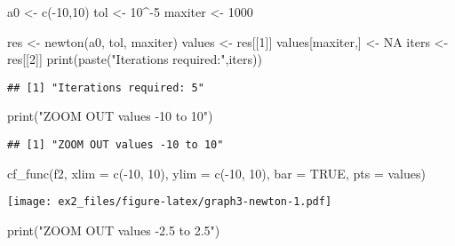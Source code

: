 \documentclass[
]{article}
\newenvironment{Shaded}{\begin{snugshade}}{\end{snugshade}}
\newcommand{\AttributeTok}[1]{\textcolor[rgb]{0.77,0.63,0.00}{#1}}
\newcommand{\ConstantTok}[1]{\textcolor[rgb]{0.00,0.00,0.00}{#1}}
\newcommand{\DecValTok}[1]{\textcolor[rgb]{0.00,0.00,0.81}{#1}}
\newcommand{\FunctionTok}[1]{\textcolor[rgb]{0.00,0.00,0.00}{#1}}
\newcommand{\NormalTok}[1]{#1}
\newcommand{\OtherTok}[1]{\textcolor[rgb]{0.56,0.35,0.01}{#1}}
\newcommand{\SpecialCharTok}[1]{\textcolor[rgb]{0.00,0.00,0.00}{#1}}
\newcommand{\StringTok}[1]{\textcolor[rgb]{0.31,0.60,0.02}{#1}}
\begin{document}
\begin{Shaded}
\begin{Highlighting}[]
\NormalTok{a0 }\OtherTok{\textless{}{-}} \FunctionTok{c}\NormalTok{(}\SpecialCharTok{{-}}\DecValTok{10}\NormalTok{,}\DecValTok{10}\NormalTok{)}
\NormalTok{tol }\OtherTok{\textless{}{-}} \DecValTok{10}\SpecialCharTok{\^{}{-}}\DecValTok{5}
\NormalTok{maxiter }\OtherTok{\textless{}{-}} \DecValTok{1000}

\NormalTok{res }\OtherTok{\textless{}{-}} \FunctionTok{newton}\NormalTok{(a0, tol, maxiter)}
\NormalTok{values }\OtherTok{\textless{}{-}}\NormalTok{ res[[}\DecValTok{1}\NormalTok{]]}
\NormalTok{values[maxiter,] }\OtherTok{\textless{}{-}} \ConstantTok{NA}
\NormalTok{iters }\OtherTok{\textless{}{-}}\NormalTok{ res[[}\DecValTok{2}\NormalTok{]]}
\FunctionTok{print}\NormalTok{(}\FunctionTok{paste}\NormalTok{(}\StringTok{"Iterations required:"}\NormalTok{,iters))}
\end{Highlighting}
\end{Shaded}

\begin{verbatim}
## [1] "Iterations required: 5"
\end{verbatim}

\begin{Shaded}
\begin{Highlighting}[]
\FunctionTok{print}\NormalTok{(}\StringTok{"ZOOM OUT values {-}10 to 10"}\NormalTok{)}
\end{Highlighting}
\end{Shaded}

\begin{verbatim}
## [1] "ZOOM OUT values -10 to 10"
\end{verbatim}

\begin{Shaded}
\begin{Highlighting}[]
\FunctionTok{cf\_func}\NormalTok{(f2, }\AttributeTok{xlim =} \FunctionTok{c}\NormalTok{(}\SpecialCharTok{{-}}\DecValTok{10}\NormalTok{, }\DecValTok{10}\NormalTok{), }\AttributeTok{ylim =} \FunctionTok{c}\NormalTok{(}\SpecialCharTok{{-}}\DecValTok{10}\NormalTok{, }\DecValTok{10}\NormalTok{), }\AttributeTok{bar =} \ConstantTok{TRUE}\NormalTok{, }\AttributeTok{pts =}\NormalTok{ values)}
\end{Highlighting}
\end{Shaded}

\texttt{[image: ex2\_files/figure-latex/graph3-newton-1.pdf]}

\begin{Shaded}
\begin{Highlighting}[]
\FunctionTok{print}\NormalTok{(}\StringTok{"ZOOM OUT values {-}2.5 to 2.5"}\NormalTok{)}
\end{Highlighting}
\end{Shaded}
\end{document}
